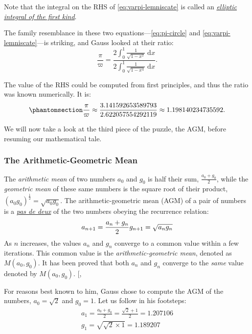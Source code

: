 \documentclass[
  a4paper,
]{article}
\begin{document}
Note that the integral on the RHS of \cref{eq:varpi-lemniscate} is
called an
\href{https://mathworld.wolfram.com/EllipticIntegraloftheFirstKind.html}{\emph{elliptic
integral of the first kind}}.

The family resemblance in these two equations---\cref{eq:pi-circle} and
\cref{eq:varpi-lemniscate}---is striking, and Gauss looked at their
ratio: \[
\displaystyle\frac{\pi}{\varpi} = \frac{2\displaystyle\int_0^1 \frac{1}{\sqrt{1 - x^2}}\;\mathrm{d}x}{2\displaystyle\int_0^1 \frac{1}{\sqrt{1 - x^4}}\;\mathrm{d}x}.
\]

The value of the RHS could be computed from first principles, and thus
the ratio was known numerically. It is:
\begin{equation}\phantomsection\label{eq:pi-varpi-ratio}{
\frac{\pi}{\varpi} \approx \frac{3.141592653589793}{2.622057554292119} \approx 1.198140234735592.
}\end{equation}

We will now take a look at the third piece of the puzzle, the AGM,
before resuming our mathematical tale.

\subsubsection{The Arithmetic-Geometric
Mean}\label{the-arithmetic-geometric-mean}

The \emph{arithmetic mean} of two numbers \(a_0\) and \(g_0\) is half
their sum, \(\frac{a_0 + g_0}{2}\), while the \emph{geometric mean} of
these same numbers is the square root of their product,
\((a_0g_0)^{\frac{1}{2}} = \sqrt{a_0 g_0}\). The arithmetic-geometric
mean (AGM) of a pair of numbers is a
\href{https://www.thefreedictionary.com/pas+de+deux}{\emph{pas de deux}}
of the two numbers obeying the recurrence relation: \[
a_{n+1} = \frac{a_n + g_n}{2}\\
g_{n+1} = \sqrt{a_n g_n}
\] As \(n\) increases, the values \(a_n\) and \(g_n\) converge to a
common value within a few iterations. This common value is the
\emph{arithmetic-geometric mean}, denoted as \(M(a_0, g_0)\). It has
been proved that both \(a_n\) and \(g_n\) converge to the \emph{same}
value denoted by \(M(a_0, g_0)\).
{[},\citeproc{ref-pi-and-the-agm}{36}{]}

For reasons best known to him, Gauss chose to compute the AGM of the
numbers, \(a_0 = \sqrt{2}\) and \(g_0 = 1\). Let us follow in his
footsteps: \[
\begin{aligned}
a_1 = \frac{a_0 + g_0}{2} = \frac{\sqrt{2} + 1}{2} = 1.207106\\
g_1 = \sqrt{\sqrt{2} \times 1} = 1.189207
\end{aligned}
\]
\end{document}
